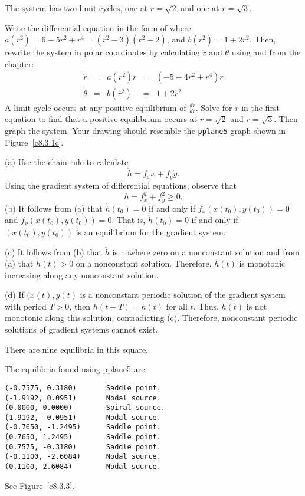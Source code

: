 \documentclass{ximera}
\begin{document}
\ans The system has two limit cycles, one at $r = \sqrt{2}$ and one
at $r = \sqrt{3}$. 

\soln Write the differential equation in the form of 
where $a(r^2) = 6 - 5r^2 + r^4=(r^2-3)(r^2-2)$, and 
$b(r^2) = 1+2r^2$.  Then,
rewrite the system in polar coordinates by calculating $\dot{r}$ and
$\dot{\theta}$ using  and  from the
chapter:
\[ 
\begin{array}{rcccl}
\dot{r} & = & a(r^2)r & = & (-5 + 4r^2 + r^4)r \\
\dot{\theta} & = & b(r^2) & = & 1+2r^2 \end{array}
\]
\newpage
A limit cycle occurs at any positive equilibrium of $\frac{dr}{dt}$.
Solve for $r$ in the first equation to find that a positive equilibrium 
occurs at $r = \sqrt{2}$ and $r = \sqrt{3}$.  Then graph the system.  Your 
drawing should resemble the {\tt pplane5} graph shown in Figure~\ref{c8.3.1c}.

\begin{figure}[htb]
                       \centerline{%
                       }
\end{figure}

\soln (a)  Use the chain rule to calculate
\[
\dot{h} = f_x\dot{x}+f_y\dot{y}.
\]
Using the gradient system of differential equations, observe that
\[
\dot{h} = f_x^2 + f_y^2\ge 0.
\]
(b) It follows from (a) that $\dot{h}(t_0)=0$ if and only if 
$f_x(x(t_0),y(t_0))=0$ and $f_y(x(t_0),y(t_0))=0$.  That is, 
$\dot{h}(t_0)=0$ if and only if $(x(t_0),y(t_0))$ is an equilibrium for the
gradient system.

\noindent (c) It follows from (b) that $\dot{h}$ is nowhere zero on a
nonconstant solution and from (a) that $\dot{h}(t)>0$ on a nonconstant
solution.  Therefore, $h(t)$ is monotonic increasing along any nonconstant
solution.

\noindent (d)  If $(x(t),y(t)$ is a nonconstant periodic solution of the
gradient system with period $T>0$, then $h(t+T)=h(t)$ for all $t$.  Thus,
$h(t)$ is not monotonic along this solution, contradicting (c).  Therefore,
nonconstant periodic solutions of gradient systems cannot exist.  

\ans There are nine equilibria in this square.

\soln  The equilibria found using {\sf pplane5} are:
\begin{verbatim}
(-0.7575, 0.3180)       Saddle point.            
(-1.9192, 0.0951)       Nodal source.            
(0.0000, 0.0000)        Spiral source.           
(1.9192, -0.0951)       Nodal source.            
(-0.7650, -1.2495)      Saddle point.            
(0.7650, 1.2495)        Saddle point.            
(0.7575, -0.3180)       Saddle point.            
(-0.1100, -2.6084)      Nodal source.            
(0.1100, 2.6084)        Nodal source.            
\end{verbatim}
See Figure~\ref{c8.3.3}.
\end{document}
